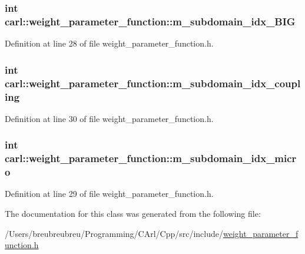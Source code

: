 \subsubsection[{m\+\_\+subdomain\+\_\+idx\+\_\+\+B\+I\+G}]{\setlength{\rightskip}{0pt plus 5cm}int carl\+::weight\+\_\+parameter\+\_\+function\+::m\+\_\+subdomain\+\_\+idx\+\_\+\+B\+I\+G\hspace{0.3cm}{\ttfamily [protected]}}\label{classcarl_1_1weight__parameter__function_a86a63e74305aaf0e2745f2269aaabc8a}


Definition at line 28 of file weight\+\_\+parameter\+\_\+function.\+h.

\hypertarget{classcarl_1_1weight__parameter__function_a64efe683ce8430a11e0361a5e2c4113a}{}
\subsubsection[{m\+\_\+subdomain\+\_\+idx\+\_\+coupling}]{\setlength{\rightskip}{0pt plus 5cm}int carl\+::weight\+\_\+parameter\+\_\+function\+::m\+\_\+subdomain\+\_\+idx\+\_\+coupling\hspace{0.3cm}{\ttfamily [protected]}}\label{classcarl_1_1weight__parameter__function_a64efe683ce8430a11e0361a5e2c4113a}


Definition at line 30 of file weight\+\_\+parameter\+\_\+function.\+h.

\hypertarget{classcarl_1_1weight__parameter__function_a653e6a23b2ce926e7e38128667425bbf}{}
\subsubsection[{m\+\_\+subdomain\+\_\+idx\+\_\+micro}]{\setlength{\rightskip}{0pt plus 5cm}int carl\+::weight\+\_\+parameter\+\_\+function\+::m\+\_\+subdomain\+\_\+idx\+\_\+micro\hspace{0.3cm}{\ttfamily [protected]}}\label{classcarl_1_1weight__parameter__function_a653e6a23b2ce926e7e38128667425bbf}


Definition at line 29 of file weight\+\_\+parameter\+\_\+function.\+h.



The documentation for this class was generated from the following file\+:\begin{DoxyCompactItemize}
\item 
/\+Users/breubreubreu/\+Programming/\+C\+Arl/\+Cpp/src/include/\hyperlink{include_2weight__parameter__function_8h}{weight\+\_\+parameter\+\_\+function.\+h}\end{DoxyCompactItemize}
